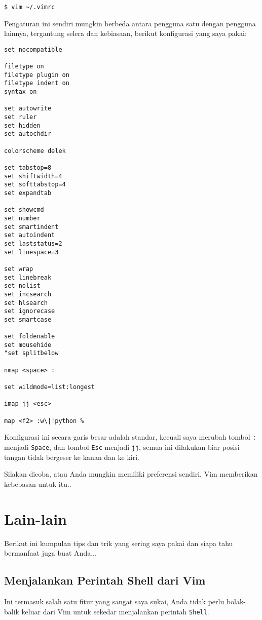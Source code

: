 \documentclass{article}
\begin{document}
\begin{verbatim}
$ vim ~/.vimrc
\end{verbatim}

Pengaturan ini sendiri mungkin berbeda antara pengguna satu
dengan pengguna lainnya, tergantung selera dan kebiasaan,
berikut konfigurasi yang saya pakai:

\begin{verbatim}
set nocompatible

filetype on
filetype plugin on
filetype indent on
syntax on

set autowrite
set ruler
set hidden
set autochdir

colorscheme delek 

set tabstop=8
set shiftwidth=4
set softtabstop=4
set expandtab

set showcmd
set number
set smartindent
set autoindent
set laststatus=2
set linespace=3

set wrap
set linebreak
set nolist
set incsearch
set hlsearch
set ignorecase
set smartcase

set foldenable
set mousehide
"set splitbelow

nmap <space> :

set wildmode=list:longest

imap jj <esc>

map <f2> :w\|!python %
\end{verbatim}

Konfigurasi ini secara garis besar adalah standar, kecuali
saya merubah tombol \verb=:= menjadi \verb=Space=, dan
tombol \verb=Esc= menjadi \verb=jj=, semua ini dilakukan
biar posisi tangan tidak bergeser ke kanan dan ke kiri.

Silakan dicoba, atau Anda mungkin memiliki preferensi
sendiri, Vim memberikan kebebasan untuk itu..

\section{Lain-lain}
Berikut ini kumpulan tips dan trik yang sering saya pakai
dan siapa tahu bermanfaat juga buat Anda...

\subsection{Menjalankan Perintah Shell dari Vim}
Ini termasuk salah satu fitur yang sangat saya sukai, Anda
tidak perlu bolak-balik keluar dari Vim untuk sekedar
menjalankan perintah \verb=Shell=.
\end{document}
